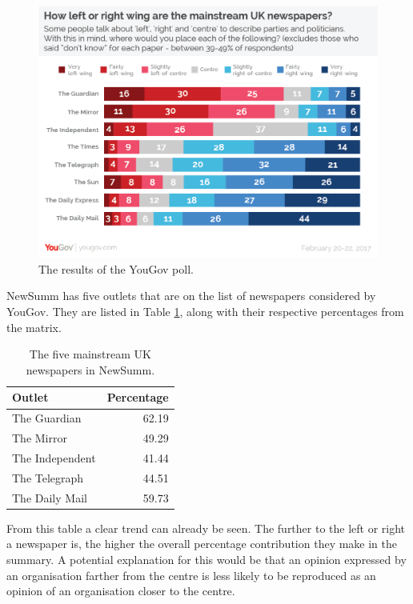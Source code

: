 \documentclass[12pt]{article}
\begin{document}
\begin{figure}[ht!]
  \centering
    \includegraphics[scale=0.4]{yougovpoll.png}
   \caption[A graph depicting responses to the User Interface Survey]{The results of the YouGov poll.}
   \label{yougov}
\end{figure}

NewSumm has five outlets that are on the list of newspapers considered by YouGov. They are listed in Table \ref{mediaorganisations}, along with their respective percentages from the matrix.

\begin{table}[H]
	\centering
	\begin{tabular}{l|r}
		\textbf{Outlet} & \textbf{Percentage} \\ \hline
		The Guardian & 62.19 \\ \hline
		The Mirror & 49.29 \\ \hline
		The Independent & 41.44 \\ \hline
		The Telegraph & 44.51 \\ \hline
		The Daily Mail & 59.73 \\ \hline
	\end{tabular}
	\caption[Parameters for estimating topic models]{The five mainstream UK newspapers in NewSumm.}
	\label{mediaorganisations}
\end{table}

From this table a clear trend can already be seen. The further to the left or right a newspaper is, the higher the overall percentage contribution they make in the summary. A potential explanation for this would be that an opinion expressed by an organisation farther from the centre is less likely to be reproduced as an opinion of an organisation closer to the centre. 
\end{document}
